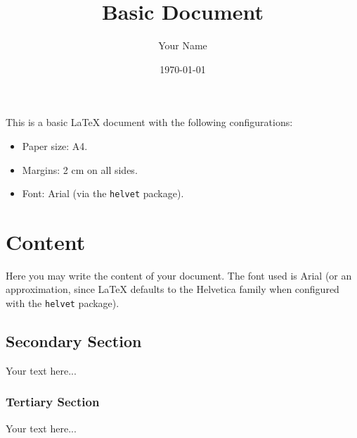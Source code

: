 \documentclass[a4paper,12pt]{article}
\title{Basic Document}
\author{Your Name}
\date{\today}
\begin{document}
	
	\maketitle
	
This is a basic \LaTeX{} document with the following configurations:

\begin{itemize}
	\item Paper size: A4.
	\item Margins: 2 cm on all sides.
	\item Font: Arial (via the \texttt{helvet} package).
\end{itemize}

\section{Content}
Here you may write the content of your document. The font used is Arial (or an approximation, since \LaTeX{} defaults to the Helvetica family when configured with the \texttt{helvet} package).

\subsection{Secondary Section}
Your text here...

\subsubsection{Tertiary Section}
Your text here...
\end{document}
